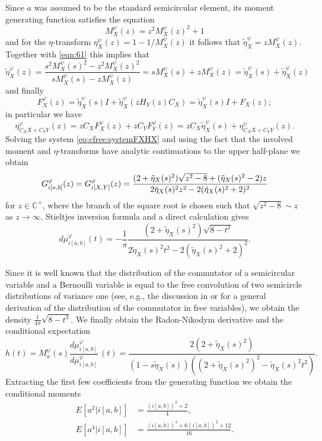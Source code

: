 \documentclass[12pt]{amsart}
\newcommand\IC{{\mathbb C}}
\def\E{E}
\theoremstyle{definition}
\numberwithin{equation}{section}
\begin{document}
Since $a$ was assumed to be the standard semicircular element, its moment
generating function satisfies the equation
\[
  M_X^{\psi}(z)=z^2 M_X^{\psi}(z)^2+1
\]
and for the $\eta$-transform  $\eta_X^\psi(z)=1-1/M_X^\psi(z)$
it follows that $\tilde{\eta}_X^{\psi}=z M_X^{\psi}(z)$.
 Together with \eqref{eqn:61} this implies that
\[
  \tilde{\eta}^{\varphi}_X(z)=\frac{s^2 M_X^{\psi}(s)^2-z^2 M_X^{\psi}(z)^2}{s
    M_X^{\psi}(s)-z M_X^{\psi}(z)}=s M_X^{\psi}(s)+z
  M_X^{\psi}(z)=\tilde{\eta}_X^{\psi}(s)+\tilde{\eta}_X^{\psi}(z)
\]
and finally
\[
  F_X^{\varphi}(z)
  =\tilde{\eta}_X^{\psi}(s)I+\tilde{\eta}_X^{\psi}(z H_Y(z)C_X)=\tilde{\eta}_X^{\psi}(s)I+F_X(z);
\]
 in particular we have
 \[
   \eta_{C_X X+C_Y Y}^{\varphi}(z)
   =z C_X F_X^{\varphi}(z)+z C_Y F_Y^{\varphi}(z)
   =z C_X \tilde{\eta}^\psi_X(s)+\eta_{C_X X+C_Y Y}^{\psi}(z)
   .
 \]
 Solving the system
  \eqref{eq:cfree:systemFXHX}
  and using the fact that the involved moment and $\eta$-transforms
  have analytic continuations to the upper half-plane
  we obtain 
\[
  G^{\varphi}_{i[a,b]}(z)
  =G^{\varphi}_{i[X,Y]}(z)
  =\frac{(2+\tilde{\eta}_X(s)^2)\sqrt{z^2-8}+(\tilde{\eta}_X(s)^2-2)z
  }{%
    2\tilde{\eta}_X(s)^2 z^2-2(\tilde{\eta}_X(s)^2+2)^2 }
\]
for $z\in \IC^+$, where the branch of the square root is chosen such that
$\sqrt{z^2-8}\sim z$ as $z\to\infty$.
Stieltjes inversion formula and a direct calculation gives 
\[
  d\mu^{\varphi}_{i[a,b]}(t)=-\frac{1}{\pi}\frac{(2+\tilde{\eta}_X(s)^2)\sqrt{8-t^2}}{2\tilde{\eta}_X(s)^2
    t^2-2(\tilde{\eta}_X(s)^2+2)^2}.
\]

Since it is well known that the distribution of the commutator of a semicircular
variable and a Bernoulli variable is equal to the free convolution of two
semicircle distributions of variance one
(see, e.g., the discussion in \cite[Example~3.12]{HaagerupLarsen} or \cite{NicaSpeicher:1998:commutator} for a general derivation of the distribution of the commutator in free variables),
we obtain the density $\tfrac{1}{4 \pi}\sqrt{8-t^2}$.
We finally obtain the Radon-Nikodym derivative and the conditional expectation
\[h(t)=M_a^\psi(s)\frac{d\mu^{\varphi}_{i[a,b]}}{d\mu^{\psi}_{i[a,b]}}\,(t)=\frac{2(2+\tilde{\eta}_X(s)^2)}{(1-s\tilde{\eta}_X(s))\left((2+\tilde{\eta}_X(s)^2)^2-\tilde{\eta}_X(s)^2 t^2\right)}.\]
Extracting the first few coefficients from the generating function we obtain
the conditional moments
\begin{align*}
  \E[a^2|i[a,b]]&=\frac{(i[a,b])^2+2}{4},\\
  \E[a^4|i[a,b]]&=\frac{(i[a,b])^4+6(i[a,b])^2+12}{16}.
\end{align*}
		
\end{document}
